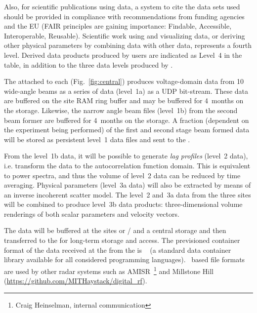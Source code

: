 \documentclass[12pt,a4paper]{article}
\begin{document}
Also, for scientific publications using \ED data, a system to cite the data sets used should be provided in compliance with recommendations from funding agencies and the EU (FAIR principles are gaining importance: Findable, Accessible, Interoperable, Reusable). %
Scientific work using and visualizing \ED data, or deriving other physical parameters by combining \ED data with other data, represents a fourth level. Derived data products produced by \ED users are indicated as Level~4 in the table, in addition to the three data levels produced by \ED.

The \fsru attached to each \SA (Fig.~\ref{fig:central}) produces voltage-domain data from 10 
wide-angle beams  
as a series of data (level~1a) as a UDP bit-stream.
These data are buffered on the site RAM ring buffer and may be buffered for
4~months on the \OC storage.  
Likewise, the narrow angle beam files
(level~1b) from the second beam former are buffered for 4~months
on the \OC storage.  
A fraction (dependent on the experiment being
performed) of the first and second stage beam formed data will be
stored as persistent level~1 data files and sent to the \DCs.


From the level~1b data, it will be possible to generate
\emph{lag profiles} (level~2 data), i.e. transform the data to the autocorrelation function domain. This is equivalent to power spectra, and thus the volume of level~2 data can be reduced by time averaging.
Physical parameters (level~3a data) will also be extracted by means of an inverse incoherent scatter model. 
The level~2 and~3a data from the three sites will be combined to produce level~3b data products: three-dimensional volume renderings of both scalar parameters and velocity vectors.

The data will be buffered at the sites or / and a central storage 
and then transferred to the \DCs for long-term storage and access.
The previsioned container format of the data received at the \DCs from the \OC is \HDF~\cite{hdf}
(a standard data container library available for all considered programming languages). \HDF~based file formats are used by other radar systems such as AMISR~\footnote{Craig Heinselman, internal communication} and Millstone Hill (\url{https://github.com/MITHaystack/digital_rf}).
\end{document}
